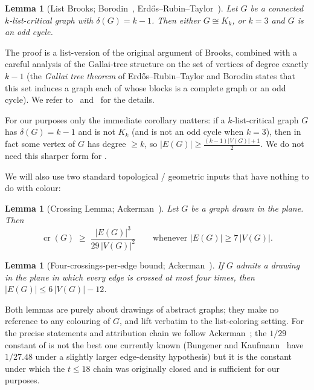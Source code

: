 \documentclass[11pt,a4paper]{article}
\newtheorem{lemma}[theorem]{Lemma}
\theoremstyle{definition}
\DeclareMathOperator{\crN}{cr}
\begin{document}
\begin{lemma}[List Brooks; Borodin~\cite{Borodin1977},
Erd\H{o}s--Rubin--Taylor~\cite{ERT}]\label{lem:list-brooks}
Let $G$ be a connected $k$-list-critical graph with
$\delta(G) = k - 1$. Then either $G \cong K_k$, or $k = 3$ and
$G$ is an odd cycle.
\end{lemma}

The proof is a list-version of the original argument of Brooks,
combined with a careful analysis of the Gallai-tree structure on
the set of vertices of degree exactly $k - 1$ (the \emph{Gallai
tree theorem} of Erd\H{o}s--Rubin--Taylor and
Borodin states that this set induces a graph each of whose blocks
is a complete graph or an odd cycle). We refer
to~\cite[Theorem~3.2 and Theorem~3.5]{ERT}
and~\cite{Borodin1977} for the details.

For our purposes only the immediate corollary matters: if a
$k$-list-critical graph $G$ has $\delta(G) = k - 1$ and is not
$K_k$ (and is not an odd cycle when $k = 3$), then in fact some
vertex of $G$ has degree $\ge k$, so
$|E(G)| \ge \tfrac{(k-1)|V(G)| + 1}{2}$. We do not need this
sharper form for .

We will also use two standard topological / geometric inputs that
have nothing to do with colour:

\begin{lemma}[Crossing Lemma; Ackerman~\cite{Ackerman}]\label{lem:cl}
Let $G$ be a graph drawn in the plane. Then
\[
   \crN(G) \;\ge\; \frac{|E(G)|^{3}}{29\,|V(G)|^{2}}
   \qquad \text{whenever } |E(G)| \ge 7\,|V(G)|.
\]
\end{lemma}

\begin{lemma}[Four-crossings-per-edge bound;
Ackerman~\cite{Ackerman}]\label{lem:fourcrossing}
If $G$ admits a drawing in the plane in which every edge is crossed
at most four times, then $|E(G)| \le 6\,|V(G)| - 12$.
\end{lemma}

Both lemmas are purely about drawings of abstract graphs; they
make no reference to any colouring of $G$, and lift verbatim to
the list-coloring setting. For the precise statements and
attribution chain we follow Ackerman~\cite[Theorem~1.1 and
Theorem~2.1]{Ackerman}; the $1/29$ constant of  is
not the best one currently known (Bungener and
Kaufmann~\cite{BK24} have $1/27.48$ under a slightly larger
edge-density hypothesis) but it is the constant under which the
$t \le 18$ chain was originally closed and is sufficient for our
purposes.
\end{document}
